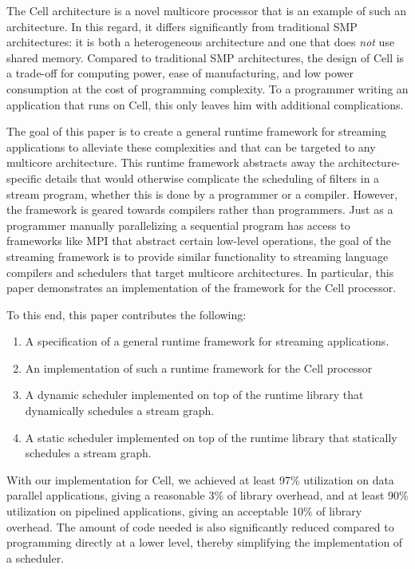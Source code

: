 The Cell architecture is a novel multicore processor that is an example of such an architecture. In this regard, it differs significantly from traditional SMP architectures: it is both a heterogeneous architecture and one that does \emph{not} use shared memory. Compared to traditional SMP architectures, the design of Cell is a trade-off for computing power, ease of manufacturing, and low power consumption at the cost of programming complexity. To a programmer writing an application that runs on Cell, this only leaves him with additional complications.

The goal of this paper is to create a general runtime framework for streaming applications to alleviate these complexities and that can be targeted to any multicore architecture. This runtime framework abstracts away the architecture-specific details that would otherwise complicate the scheduling of filters in a stream program, whether this is done by a programmer or a compiler. However, the framework is geared towards compilers rather than programmers. Just as a programmer manually parallelizing a sequential program has access to frameworks like MPI that abstract certain low-level operations, the goal of the streaming framework is to provide similar functionality to streaming language compilers and schedulers that target multicore architectures. In particular, this paper demonstrates an implementation of the framework for the Cell processor.

To this end, this paper contributes the following:
\begin{enumerate}
\item A specification of a general runtime framework for streaming applications.
\item An implementation of such a runtime framework for the Cell processor
\item A dynamic scheduler implemented on top of the runtime library that dynamically schedules a stream graph.
\item A static scheduler implemented on top of the runtime library that statically schedules a stream graph.
\end{enumerate}

With our implementation for Cell, we achieved at least 97\% utilization on data parallel applications, giving a reasonable 3\% of library overhead, and at least 90\% utilization on pipelined applications, giving an acceptable 10\% of library overhead. The amount of code needed is also significantly reduced compared to programming directly at a lower level, thereby simplifying the implementation of a scheduler.

